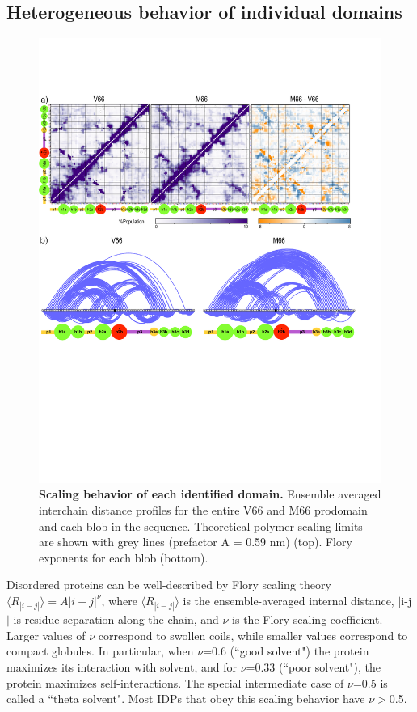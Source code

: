 \documentclass[10pt,letterpaper]{article}
\begin{document}
\subsection{Heterogeneous behavior of individual domains}

\begin{figure}[!ht]
\includegraphics[scale=0.5,width=\textwidth,trim={0 0cm 0 0cm},clip]{./figures/S3.pdf}
\caption{{\bf Scaling behavior of each identified domain.} Ensemble averaged interchain distance profiles for the entire V66 and M66 prodomain and each blob in the sequence. 
Theoretical polymer scaling limits are shown with grey lines (prefactor A = 0.59 nm) (top). Flory exponents for each blob (bottom).}
\label{S2} 
\end{figure}

Disordered proteins can be well-described by Flory scaling theory $\langle R_{|i-j|}\rangle = A|i-j|^{\nu}$, where $\langle R_{|i-j|}\rangle$ is the ensemble-averaged internal distance, $|$i-j$|$ is residue separation along the chain, and $\nu$ is the Flory scaling coefficient\cite{Flory1949}. Larger values of $\nu$ correspond to swollen coils, while smaller values correspond to compact globules\cite{Das2013a}. In particular, when $\nu$=0.6 (``good solvent") the protein maximizes its interaction with solvent, and for $\nu$=0.33 (``poor solvent"), the protein maximizes self-interactions. The special intermediate case of $\nu$=0.5 is called a ``theta solvent"\cite{Flory1949}. Most IDPs that obey this scaling behavior have $\nu$$>$0.5\cite{Hofmann2012,Das2013a,Zerze2015,Meng2018}. 
\end{document}
